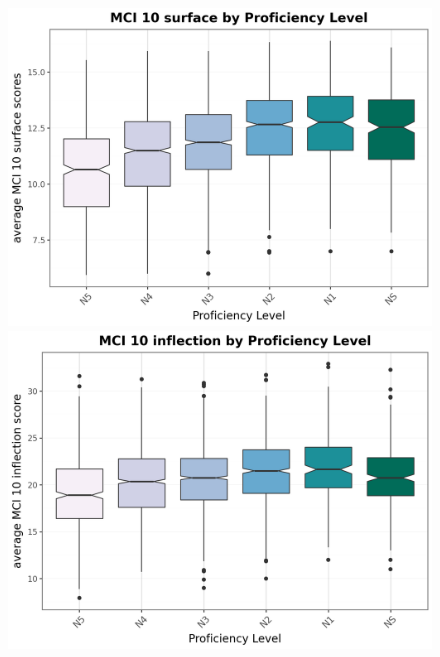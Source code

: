 \begin{figure}[htbp]
    \centering
    \begin{minipage}{.48\textwidth}
        \centering
    \includegraphics[scale=.4]{img/MCI10surface}
    \caption[MCI 10 surface scores across Proficiency levels]{}
        \label{fig:MCI10surface}
    \end{minipage}
    \hfill
\begin{minipage}{.48\textwidth}
        \centering
        \includegraphics[scale=.4]{img/MCI10inflection}
        \caption[MCI 10 inflection scores across Proficiency levels]{}
\label{fig:MCI10inflection}
\end{minipage}
    \end{figure}

